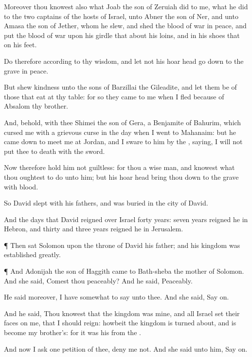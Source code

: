 {Moreover thou
knowest also what
Joab the
son of
Zeruiah
did to me,
{} what he
did to the
two
captains of the
hosts of
Israel, unto
Abner the
son of
Ner, and unto
Amasa the
son of
Jether, whom he
slew, and
shed the
blood of
war in
peace, and
put the
blood of
war upon his
girdle that
{} about his
loins, and in his
shoes that
{} on his
feet.

Do therefore according to thy
wisdom, and let not his hoar
head go
down to the
grave in
peace.

But
shew
kindness unto the
sons of
Barzillai the
Gileadite, and let them be of those that
eat at thy
table: for so they
came to me when I
fled
because of
Absalom thy
brother.

And, behold,
{} with thee
Shimei the
son of
Gera, a
Benjamite of
Bahurim, which
cursed me with a
grievous
curse in the
day when I
went to
Mahanaim: but he came
down to
meet me at
Jordan, and I
sware to him by the
{},
saying, I will not put thee to
death with the
sword.

Now therefore hold him not
guiltless: for thou
{} a
wise
man, and
knowest what thou oughtest to
do unto him; but his hoar
head bring thou
down to the
grave with
blood.

So
David
slept with his
fathers, and was
buried in the
city of
David.

And the
days that
David
reigned over
Israel
{}
forty
years:
seven
years
reigned he in
Hebron, and
thirty and
three
years
reigned he in
Jerusalem.


\par }{\PP {}¶ Then
sat
Solomon upon the
throne of
David his
father; and his
kingdom was
established
greatly.


\par }{\PP {}¶ And
Adonijah the
son of
Haggith
came to
Bath-sheba the
mother of
Solomon. And she
said,
Comest thou
peaceably? And he
said,
Peaceably.

He
said moreover, I have somewhat to
say unto thee. And she
said, Say
on.

And he
said, Thou
knowest that the
kingdom was mine, and
{} all
Israel
set their
faces on me, that I should
reign: howbeit the
kingdom is turned
about, and is become my
brother’s: for it was his from the
{}.

And now I
ask
one
petition of thee,
deny
me not. And she
said unto him, Say
on.

}
